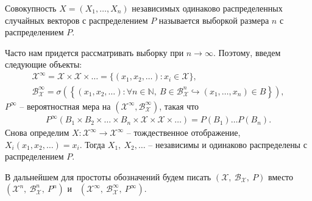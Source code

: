 \begin{definition}
	Совокупность $\displaystyle X=( X_{1} ,\dotsc ,X_{n})$ независимых одинаково распределенных случайных векторов с распределением $\displaystyle P$ называется выборкой размера $\displaystyle n$ с распределением $\displaystyle P$.
\end{definition}
Часто нам придется рассматривать выборку при $\displaystyle n\rightarrow \infty $. Поэтому, введем следующие объекты: 
\begin{gather*}
    \mathcal{X}^{\infty } =\mathcal{X} \times \mathcal{X} \times \dotsc =\{( x_{1} ,x_{2} ,\dotsc ) :x_{i} \in \mathcal{X}\},\\ \displaystyle \mathcal{B}_{\mathcal{X}}^{\infty } =\sigma \left(\left\{( x_{1} ,x_{2} ,\dotsc ) :\forall n\in \mathbb{N} ,\ B\in \mathcal{B}_{\mathcal{X}}^{n} \hookrightarrow ( x_{1} ,\dotsc ,x_{n}) \in B\right\}\right),
\end{gather*}
$\displaystyle P^{\infty }$ -- вероятностная мера на $\displaystyle \left(\mathcal{X}^{\infty } ,\mathcal{B}_{\mathcal{X}}^{\infty }\right)$, такая что 
\begin{gather*}
    P^{\infty }( B_{1} \times B_{2} \times \dotsc \times B_{n} \times \mathcal{X} \times \mathcal{X} \times \dotsc ) =P( B_{1}) \dotsc P( B_{n}).
\end{gather*}
Снова определим $\displaystyle X:\mathcal{X}^{\infty }\rightarrow \mathcal{X}^{\infty }$ -- тождественное отображение, $\displaystyle X_{i}( x_{1} ,x_{2} ,\dotsc ) =x_{i}$. Тогда $\displaystyle X_{1},\ X_{2} ,\dotsc $ -- независимы и одинаково распределены с распределением $\displaystyle P$.

В дальнейшем для простоты обозначений будем писать $\displaystyle (\mathcal{X},\ \mathcal{B}_{\mathcal{X}},\ P)$ вместо $\displaystyle \left(\mathcal{X}^{n},\ \mathcal{B}_{\mathcal{X}}^{n},\ P^{n}\right)$ и \ $\displaystyle \left(\mathcal{X}^{\infty },\ \mathcal{B}_{\mathcal{X}}^{\infty },\ P^{\infty }\right)$.

